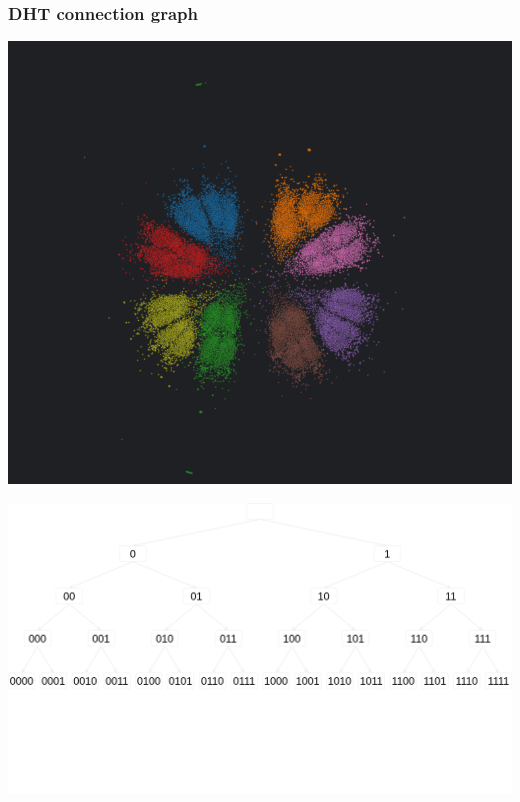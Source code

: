 \documentclass{pl-slide}
\begin{document}
\begin{frame}
\frametitle{DHT connection graph}
\begin{minipage}[b]{.49\linewidth}
\begin{center}
        \includegraphics[width=\linewidth,keepaspectratio]{resources/dht-graph.png}
\end{center}
\end{minipage}
\begin{minipage}[b]{.49\linewidth}
\begin{center}
        \includegraphics[width=\linewidth,keepaspectratio]{resources/dht-vanilla.png}
\end{center}
\end{minipage}

\end{frame}
\end{document}

